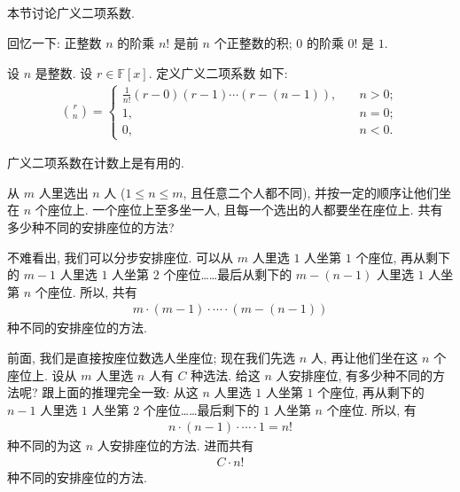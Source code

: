 \subsection*{\GeneralizedBinomialCoefficients}
\markright{\GeneralizedBinomialCoefficients}

本节讨论广义二项系数.

回忆一下: 正整数 $n$ 的阶乘 $n!$ 是前 $n$ 个正整数的积; $0$ 的阶乘 $0!$ 是 $1$.

\begin{definition}
    设 $n$ 是整数. 设 $r \in \mathbb{F}[x]$. 定义广义二项系数  如下:
    \begin{align*}
        \binom{r}{n} = \begin{cases}
            \frac{1}{n!} (r - 0)(r - 1) \cdots (r - (n - 1)), & \quad n > 0; \\
            1,                                                & \quad n = 0; \\
            0,                                                & \quad n < 0.
        \end{cases}
    \end{align*}
\end{definition}

广义二项系数在计数上是有用的.

从 $m$ 人里选出 $n$ 人 ($1 \leq n \leq m$, 且任意二个人都不同), 并按一定的顺序让他们坐在 $n$ 个座位上. 一个座位上至多坐一人, 且每一个选出的人都要坐在座位上. 共有多少种不同的安排座位的方法?

不难看出, 我们可以分步安排座位. 可以从 $m$ 人里选 $1$ 人坐第 $1$ 个座位, 再从剩下的 $m-1$ 人里选 $1$ 人坐第 $2$ 个座位……最后从剩下的 $m - (n - 1)$ 人里选 $1$ 人坐第 $n$ 个座位. 所以, 共有
\begin{align*}
    m \cdot (m-1) \cdot \cdots \cdot (m - (n - 1))
\end{align*}
种不同的安排座位的方法.

前面, 我们是直接按座位数选人坐座位; 现在我们先选 $n$ 人, 再让他们坐在这 $n$ 个座位上. 设从 $m$ 人里选 $n$ 人有 $C$ 种选法. 给这 $n$ 人安排座位, 有多少种不同的方法呢? 跟上面的推理完全一致: 从这 $n$ 人里选 $1$ 人坐第 $1$ 个座位, 再从剩下的 $n-1$ 人里选 $1$ 人坐第 $2$ 个座位……最后剩下的 $1$ 人坐第 $n$ 个座位. 所以, 有
\begin{align*}
    n \cdot (n - 1) \cdot \cdots \cdot 1 = n!
\end{align*}
种不同的为这 $n$ 人安排座位的方法. 进而共有
\begin{align*}
    C \cdot n!
\end{align*}
种不同的安排座位的方法.

